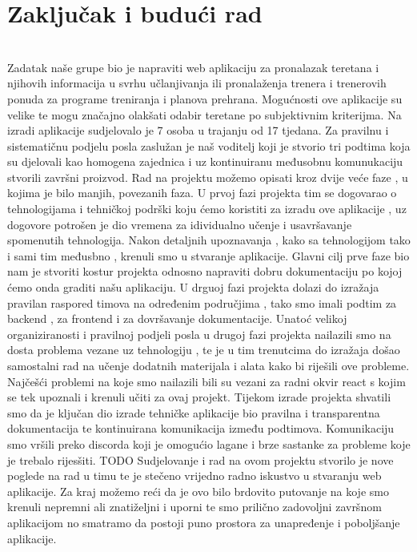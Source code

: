 \chapter{Zaključak i budući rad}
		
		\textbf{}\\
		  Zadatak naše grupe bio je napraviti web aplikaciju za  pronalazak teretana i njihovih informacija u svrhu učlanjivanja ili pronalaženja trenera i trenerovih ponuda za programe treniranja i planova prehrana. Mogućnosti ove aplikacije su velike te mogu značajno olakšati odabir teretane po subjektivnim kriterijma. Na izradi aplikacije sudjelovalo je 7 osoba u trajanju od 17 tjedana. Za pravilnu i sistematičnu podjelu posla zaslužan je naš voditelj koji je stvorio tri podtima koja su djelovali kao homogena zajednica i uz kontinuiranu međusobnu komunukaciju stvorili završni proizvod. Rad na projektu možemo opisati kroz dvije veće faze , u kojima je bilo manjih, povezanih faza. U prvoj fazi projekta tim se dogovarao o tehnologijama i tehničkoj podrški koju ćemo koristiti za izradu ove aplikacije , uz dogovore potrošen je dio vremena za idividualno učenje i usavršavanje spomenutih tehnologija. Nakon detaljnih upoznavanja , kako sa tehnologijom tako i sami tim međusbno , krenuli smo u stvaranje aplikacije. Glavni cilj prve faze bio nam je stvoriti kostur projekta odnosno napraviti dobru dokumentaciju po kojoj ćemo onda graditi našu aplikaciju. U drguoj fazi projekta dolazi do izražaja pravilan raspored timova na određenim područjima , tako smo imali podtim za backend , za frontend i za dovršavanje dokumentacije. Unatoć velikoj organiziranosti i pravilnoj podjeli posla u drugoj fazi projekta nailazili smo na dosta problema vezane uz tehnologiju , te je u tim trenutcima do izražaja došao samostalni rad na učenje dodatnih materijala i alata kako bi riješili ove probleme. Najčešći problemi na koje smo nailazili bili su vezani za radni okvir react s kojim se tek upoznali i krenuli učiti za ovaj projekt. Tijekom izrade projekta shvatili smo da je ključan dio izrade tehničke aplikacije bio pravilna i transparentna dokumentacija te kontinuirana komunikacija između podtimova. Komunikaciju smo vršili preko discorda koji je omogućio lagane i brze sastanke za probleme koje je trebalo rijesšiti. TODO
		  Sudjelovanje i rad na ovom projektu stvorilo je nove poglede na rad u timu te je stečeno vrijedno radno iskustvo u stvaranju web aplikacije. Za kraj možemo reći da je ovo bilo  brdovito putovanje na koje smo krenuli nepremni ali znatiželjni i uporni te smo prilično zadovoljni završnom aplikacijom no smatramo da postoji puno prostora za unapređenje i poboljšanje aplikacije.
		\eject 